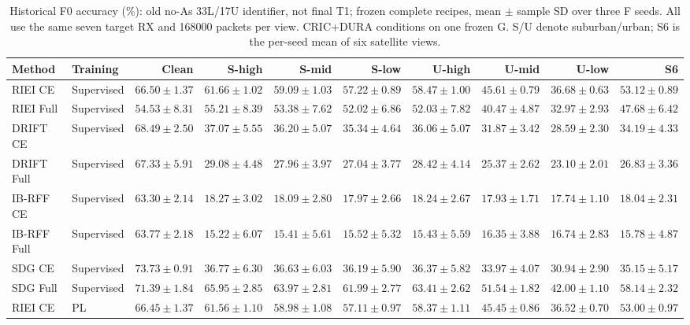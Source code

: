 \begin{table}[t]
\centering\scriptsize\setlength{\tabcolsep}{3pt}
\caption{Historical F0 accuracy (\%): old no-As 33L/17U identifier, not final T1; frozen complete recipes, mean $\pm$ sample SD over three F seeds. All use the same seven target RX and 168000 packets per view. CRIC+DURA conditions on one frozen G. S/U denote suburban/urban; S6 is the per-seed mean of six satellite views.}
\label{tab:cric-full-f0}
\begin{tabular}{llrrrrrrrr}
\toprule
Method & Training & Clean & S-high & S-mid & S-low & U-high & U-mid & U-low & S6 \\
\midrule
RIEI CE & Supervised & $66.50\!\pm\!1.37$ & $61.66\!\pm\!1.02$ & $59.09\!\pm\!1.03$ & $57.22\!\pm\!0.89$ & $58.47\!\pm\!1.00$ & $45.61\!\pm\!0.79$ & $36.68\!\pm\!0.63$ & $53.12\!\pm\!0.89$ \\
RIEI Full & Supervised & $54.53\!\pm\!8.31$ & $55.21\!\pm\!8.39$ & $53.38\!\pm\!7.62$ & $52.02\!\pm\!6.86$ & $52.03\!\pm\!7.82$ & $40.47\!\pm\!4.87$ & $32.97\!\pm\!2.93$ & $47.68\!\pm\!6.42$ \\
DRIFT CE & Supervised & $68.49\!\pm\!2.50$ & $37.07\!\pm\!5.55$ & $36.20\!\pm\!5.07$ & $35.34\!\pm\!4.64$ & $36.06\!\pm\!5.07$ & $31.87\!\pm\!3.42$ & $28.59\!\pm\!2.30$ & $34.19\!\pm\!4.33$ \\
DRIFT Full & Supervised & $67.33\!\pm\!5.91$ & $29.08\!\pm\!4.48$ & $27.96\!\pm\!3.97$ & $27.04\!\pm\!3.77$ & $28.42\!\pm\!4.14$ & $25.37\!\pm\!2.62$ & $23.10\!\pm\!2.01$ & $26.83\!\pm\!3.36$ \\
IB-RFF CE & Supervised & $63.30\!\pm\!2.14$ & $18.27\!\pm\!3.02$ & $18.09\!\pm\!2.80$ & $17.97\!\pm\!2.66$ & $18.24\!\pm\!2.67$ & $17.93\!\pm\!1.71$ & $17.74\!\pm\!1.10$ & $18.04\!\pm\!2.31$ \\
IB-RFF Full & Supervised & $63.77\!\pm\!2.18$ & $15.22\!\pm\!6.07$ & $15.41\!\pm\!5.61$ & $15.52\!\pm\!5.32$ & $15.43\!\pm\!5.59$ & $16.35\!\pm\!3.88$ & $16.74\!\pm\!2.83$ & $15.78\!\pm\!4.87$ \\
SDG CE & Supervised & $73.73\!\pm\!0.91$ & $36.77\!\pm\!6.30$ & $36.63\!\pm\!6.03$ & $36.19\!\pm\!5.90$ & $36.37\!\pm\!5.82$ & $33.97\!\pm\!4.07$ & $30.94\!\pm\!2.90$ & $35.15\!\pm\!5.17$ \\
SDG Full & Supervised & $71.39\!\pm\!1.84$ & $65.95\!\pm\!2.85$ & $63.97\!\pm\!2.81$ & $61.99\!\pm\!2.77$ & $63.41\!\pm\!2.62$ & $51.54\!\pm\!1.82$ & $42.00\!\pm\!1.10$ & $58.14\!\pm\!2.32$ \\
RIEI CE & PL & $66.45\!\pm\!1.37$ & $61.56\!\pm\!1.10$ & $58.98\!\pm\!1.08$ & $57.11\!\pm\!0.97$ & $58.37\!\pm\!1.11$ & $45.45\!\pm\!0.86$ & $36.52\!\pm\!0.70$ & $53.00\!\pm\!0.97$ \\

\end{tabular}
\end{table}
